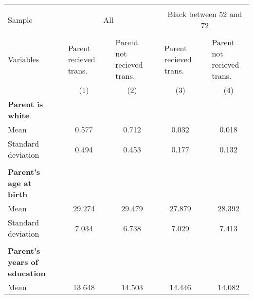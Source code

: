 \begin{tabular}{lrccccccc}
\toprule
          &           &           &           &           &           &           &           &  \\
Sample    &           & \multicolumn{3}{c}{All}           &           & \multicolumn{3}{c}{Black between 52 and 72} \\
\cmidrule{1-1}\cmidrule{3-5}\cmidrule{7-9}          &           &           &           &           &           &           &           &  \\
Variables &           & \multicolumn{1}{l}{Parent recieved trans.} &           & \multicolumn{1}{l}{Parent not recieved trans.} &           & \multicolumn{1}{l}{Parent recieved trans.} &           & \multicolumn{1}{l}{Parent not recieved trans.} \\
\cmidrule{1-1}\cmidrule{3-3}\cmidrule{5-5}\cmidrule{7-7}\cmidrule{9-9}          &           & (1)       &           & (2)       &           & (3)       &           & (4) \\
\textbf{Parent is white} &           &           &           &           &           &           &           &  \\
Mean      &           & 0.577     &           & 0.712     &           & 0.032     &           & 0.018 \\
Standard deviation &           & 0.494     &           & 0.453     &           & 0.177     &           & 0.132 \\
          &           &           &           &           &           &           &           &  \\
\textbf{Parent's age at birth} &           &           &           &           &           &           &           &  \\
Mean      &           & 29.274    &           & 29.479    &           & 27.879    &           & 28.392 \\
Standard deviation &           & 7.034     &           & 6.738     &           & 7.029     &           & 7.413 \\
          &           &           &           &           &           &           &           &  \\
\textbf{Parent's years of education} &           &           &           &           &           &           &           &  \\
Mean      &           & 13.648    &           & 14.503    &           & 14.446    &           & 14.082 \\

\end{tabular}
